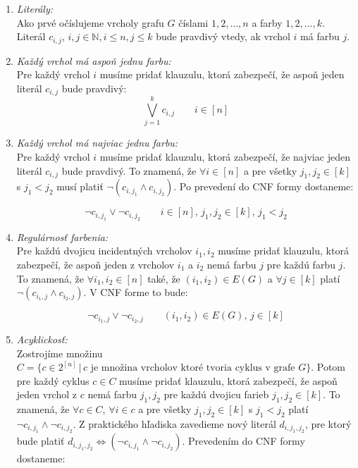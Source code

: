 \documentclass[11pt]{article}
\begin{document}
\begin{enumerate}
    \item \textit{Literály:}\\
    Ako prvé očíslujeme vrcholy grafu $G$ číslami $1, 2, \ldots, n$ a farby $1, 2, \ldots, k$. Literál $c_{i, j}$, $i, j \in \mathbb{N}, i \leq n, j \leq k$ bude pravdivý vtedy, ak vrchol $i$ má farbu $j$.

    \item \textit{Každý vrchol má aspoň jednu farbu:}\\
    Pre každý vrchol $i$ musíme pridať klauzulu, ktorá zabezpečí, že aspoň jeden literál $c_{i, j}$ bude pravdivý:
    $$\bigvee_{j = 1}^{k} c_{i, j} \qquad i \in [ n ]$$

    \item \textit{Každý vrchol má najviac jednu farbu:}\\
    Pre každý vrchol $i$ musíme pridať klauzulu, ktorá zabezpečí, že najviac jeden literál $c_{i, j}$ bude pravdivý. To znamená, že $\forall i \in [n]$ a pre všetky $j_1, j_2 \in [k]$ s $j_1 < j_2$ musí platiť $\neg ( c_{i, j_1} \land c_{i, j_2})$. Po prevedení do CNF formy dostaneme:

    $$\neg c_{i, j_1} \vee \neg c_{i, j_2} \qquad i \in [ n ], \, j_1, j_2 \in [k], \, j_1 < j_2$$

    \item \textit{Regulárnosť farbenia:}\\
    Pre každú dvojicu incidentných vrcholov $i_1, i_2$ musíme pridať klauzulu, ktorá zabezpečí, že aspoň jeden z vrcholov $i_1$ a $i_2$ nemá farbu $j$ pre každú farbu $j$. To znamená, že $\forall i_1, i_2 \in [n]$ také, že $(i_1, i_2) \in E(G)$ a $\forall j \in [k]$ platí $\neg (c_{i_1, j} \land c_{i_2, j})$. V CNF forme to bude:

    $$\neg c_{i_1, j} \vee \neg c_{i_2, j} \qquad (i_1, i_2) \in E(G), \, j \in [k]$$

    \item \textit{Acyklickosť:}\\
    Zostrojíme množinu $C = \{c \in 2^{[n]} \, | \, c \text{ je množina vrcholov ktoré tvoria cyklus v grafe $G$}\}$. Potom pre každý cyklus $c \in C$ musíme pridať klauzulu, ktorá zabezpečí, že aspoň jeden vrchol z $c$ nemá farbu $j_1, j_2$ pre každú dvojicu farieb $j_1, j_2 \in [k]$. To znamená, že $\forall c \in C$, $\forall i \in c$ a pre všetky $j_1, j_2 \in [k]$ s $j_1 < j_2$ platí $\neg c_{i, j_1} \land \neg c_{i, j_2}$. Z praktického hľadiska zavedieme nový literál $d_{i, j_1, j_2}$, pre ktorý bude platiť $d_{i, j_1, j_2} \Leftrightarrow \left(\neg c_{i, j_1} \land \neg c_{i, j_2}\right)$. Prevedením do CNF formy dostaneme:


\end{enumerate}
\end{document}

